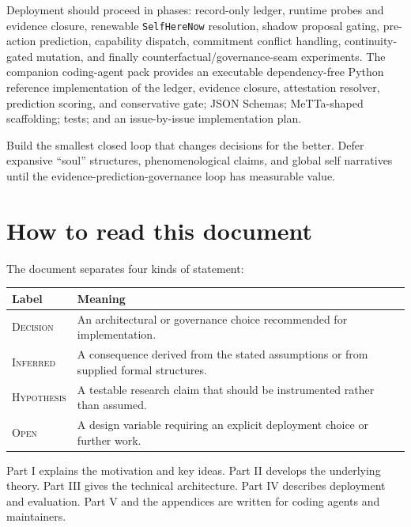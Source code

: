 \documentclass[11pt,oneside]{report}
\newcommand{\SelfHereNow}{\texttt{SelfHereNow}}
\newcommand{\statusdecision}{\textsc{Decision}}
\newcommand{\statusinferred}{\textsc{Inferred}}
\newcommand{\statushypothesis}{\textsc{Hypothesis}}
\newcommand{\statusopen}{\textsc{Open}}
\begin{document}
Deployment should proceed in phases: record-only ledger, runtime probes and evidence closure, renewable \SelfHereNow{} resolution, shadow proposal gating, pre-action prediction, capability dispatch, commitment conflict handling, continuity-gated mutation, and finally counterfactual/governance-seam experiments. The companion coding-agent pack provides an executable dependency-free Python reference implementation of the ledger, evidence closure, attestation resolver, prediction scoring, and conservative gate; JSON Schemas; MeTTa-shaped scaffolding; tests; and an issue-by-issue implementation plan.

\begin{decisionbox}
Build the smallest closed loop that changes decisions for the better. Defer expansive ``soul'' structures, phenomenological claims, and global self narratives until the evidence-prediction-governance loop has measurable value.
\end{decisionbox}

\chapter*{How to read this document}

The document separates four kinds of statement:

\begin{longtable}{@{}L{1.25in}L{5.30in}@{}}
\toprule
\textbf{Label} & \textbf{Meaning} \\
\midrule
\statusdecision & An architectural or governance choice recommended for implementation. \\
\statusinferred & A consequence derived from the stated assumptions or from supplied formal structures. \\
\statushypothesis & A testable research claim that should be instrumented rather than assumed. \\
\statusopen & A design variable requiring an explicit deployment choice or further work. \\
\bottomrule
\end{longtable}

Part I explains the motivation and key ideas. Part II develops the underlying theory. Part III gives the technical architecture. Part IV describes deployment and evaluation. Part V and the appendices are written for coding agents and maintainers.

\clearpage
{}
\end{document}
